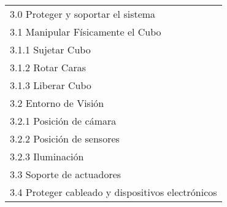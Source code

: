 \begin{table}[h]
\begin{tabular}{l}
3.0 \; Proteger y soportar el sistema \\
\hspace{0.5cm} 3.1 \; Manipular Físicamente el Cubo \\
\hspace{1cm} 3.1.1 \; Sujetar Cubo \\
\hspace{1cm} 3.1.2 \; Rotar Caras \\
\hspace{1cm} 3.1.3 \; Liberar Cubo \\
\hspace{0.5cm} 3.2 \; Entorno de Visión \\
\hspace{1cm} 3.2.1 \; Posición de cámara \\
\hspace{1cm} 3.2.2 \; Posición de sensores \\
\hspace{1cm} 3.2.3 \; Iluminación \\
\hspace{0.5cm} 3.3 \; Soporte de actuadores \\
\hspace{0.5cm} 3.4 \; Proteger cableado y dispositivos electrónicos \\\hline
\end{tabular}%
\end{table}
\renewcommand{\arraystretch}{1.0} %